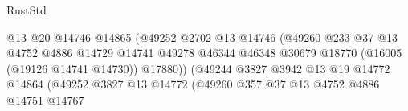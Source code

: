 \begin{lexlean}{RustStd}
\begin{coremodule}
                                                    @13
                                                    @20
                                                    @14746
                                                    @14865
                                                    (@49252
                                                      @2702
                                                      @13
                                                      @14746
                                                      (@49260
                                                        @233
                                                        @37
                                                        @13
                                                        @4752
                                                        @4886
                                                        @14729
                                                        @14741
                                                        @49278
                                                        @46344
                                                        @46348
                                                        @30679
                                                        @18770
                                                        (@16005 (@19126 @14741 @14730))
                                                        @17880))
                                                    (@49244
                                                      @3827
                                                      @3942
                                                      @13
                                                      @19
                                                      @14772
                                                      @14864
                                                      (@49252
                                                        @3827
                                                        @13
                                                        @14772
                                                        (@49260
                                                          @357
                                                          @37
                                                          @13
                                                          @4752
                                                          @4886
                                                          @14751
                                                          @14767

\end{coremodule}
\end{lexlean}
